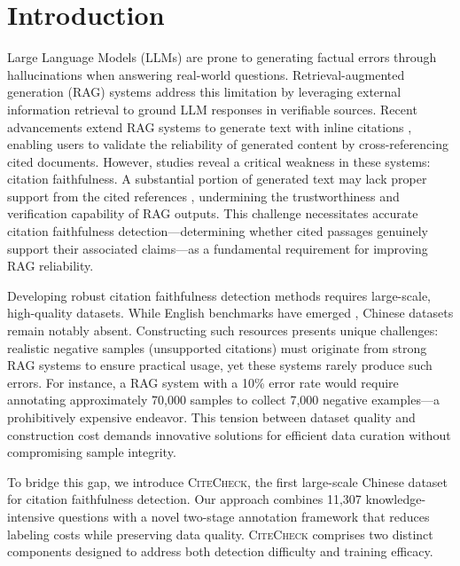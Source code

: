 


















\section{Introduction}
Large Language Models (LLMs) are prone to generating factual errors through hallucinations when answering real-world questions. Retrieval-augmented generation (RAG) systems \cite{DBLP:conf/nips/LewisPPPKGKLYR020,GuuLTPC20,BorgeaudMHCRM0L22} address this limitation by leveraging external information retrieval to ground LLM responses in verifiable sources. Recent advancements extend RAG systems to generate text with inline citations \cite{DBLP:conf/emnlp/GaoYYC23}, enabling users to validate the reliability of generated content by cross-referencing cited documents. However, studies reveal a critical weakness in these systems: citation faithfulness. A substantial portion of generated text may lack proper support from the cited references \cite{DBLP:conf/emnlp/LiuZL23, hu2024evaluate}, undermining the trustworthiness and verification capability of RAG outputs. This challenge necessitates accurate citation faithfulness detection—determining whether cited passages genuinely support their associated claims—as a fundamental requirement for improving RAG reliability.

Developing robust citation faithfulness detection methods requires large-scale, high-quality datasets. While English benchmarks have emerged \cite{DBLP:conf/emnlp/YueWCZS023}, Chinese datasets remain notably absent. Constructing such resources presents unique challenges: realistic negative samples (unsupported citations) must originate from strong RAG systems to ensure practical usage, yet these systems rarely produce such errors. For instance, a RAG system with a 10\% error rate would require annotating approximately 70,000 samples to collect 7,000 negative examples—a prohibitively expensive endeavor. This tension between dataset quality and construction cost demands innovative solutions for efficient data curation without compromising sample integrity.

To bridge this gap, we introduce \textsc{CiteCheck}, the first large-scale Chinese dataset for citation faithfulness detection. Our approach combines 11,307 knowledge-intensive questions with a novel two-stage annotation framework that reduces labeling costs while preserving data quality. \textsc{CiteCheck} comprises two distinct components designed to address both detection difficulty and training efficacy. 

